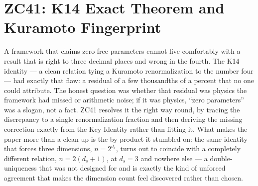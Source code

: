 \documentclass[12pt, a4paper]{article}
\begin{document}
\newpage

\section{ZC41: K14 Exact Theorem and Kuramoto Fingerprint}
\label{sec:zc41}

A framework that claims zero free parameters cannot live comfortably with a
result that is right to three decimal places and wrong in the fourth. The K14
identity --- a clean relation tying a Kuramoto renormalization to the number
four --- had exactly that flaw: a residual of a few thousandths of a percent
that no one could attribute. The honest question was whether that residual was
physics the framework had missed or arithmetic noise; if it was physics, ``zero
parameters'' was a slogan, not a fact. ZC41 resolves it the right way round, by
tracing the discrepancy to a single renormalization fraction and then deriving
the missing correction exactly from the Key Identity rather than fitting it.
What makes the paper more than a clean-up is the by-product it stumbled on: the
same identity that forces three dimensions, $n=2^{d_s}$, turns out to coincide
with a completely different relation, $n=2(d_s+1)$, at $d_s=3$ and nowhere else
--- a double-uniqueness that was not designed for and is exactly the kind of
unforced agreement that makes the dimension count feel discovered rather than
chosen.

\end{document}
